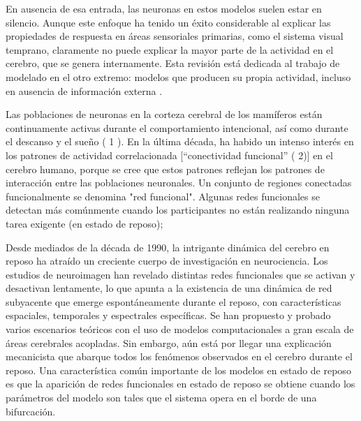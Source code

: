 En ausencia de esa entrada, las neuronas en estos modelos suelen estar en silencio. Aunque este enfoque ha tenido un éxito considerable al explicar las propiedades de respuesta en áreas sensoriales primarias, como el sistema visual temprano, claramente no puede explicar la mayor parte de la actividad en el cerebro, que se genera internamente. Esta revisión está dedicada al trabajo de modelado en el otro extremo: modelos que producen su propia actividad, incluso en ausencia de información externa \cite{vogels_neural_2005}. 

Las poblaciones de neuronas en la corteza cerebral de los mamíferos están continuamente activas durante el comportamiento intencional, así como durante el descanso y el sueño ( 1 ).  En la última década, ha habido un intenso interés en los patrones de actividad correlacionada [“conectividad funcional” ( 2)] en el cerebro humano, porque se cree que estos patrones reflejan los patrones de interacción entre las poblaciones neuronales.  Un conjunto de regiones conectadas funcionalmente se denomina "red funcional". Algunas redes funcionales se detectan más comúnmente cuando los participantes no están realizando ninguna tarea exigente (en estado de reposo);

Desde mediados de la década de 1990, la intrigante dinámica del cerebro en reposo ha atraído un creciente cuerpo de investigación en neurociencia. Los estudios de neuroimagen han revelado distintas redes funcionales que se activan y desactivan lentamente, lo que apunta a la existencia de una dinámica de red subyacente que emerge espontáneamente durante el reposo, con características espaciales, temporales y espectrales específicas. Se han propuesto y probado varios escenarios teóricos con el uso de modelos computacionales a gran escala de áreas cerebrales acopladas. Sin embargo, aún está por llegar una explicación mecanicista que abarque todos los fenómenos observados en el cerebro durante el reposo. Una característica común importante de los modelos en estado de reposo es que la aparición de redes funcionales en estado de reposo se obtiene cuando los parámetros del modelo son tales que el sistema opera en el borde de una bifurcación.


